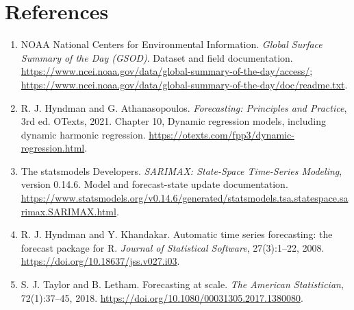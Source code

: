 \documentclass{article}
\begin{document}
\section*{References}
\raggedright
\begin{enumerate}
\item NOAA National Centers for Environmental Information. \emph{Global Surface
Summary of the Day (GSOD)}. Dataset and field documentation.
\url{https://www.ncei.noaa.gov/data/global-summary-of-the-day/access/};
\url{https://www.ncei.noaa.gov/data/global-summary-of-the-day/doc/readme.txt}.
\item R. J. Hyndman and G. Athanasopoulos. \emph{Forecasting: Principles and
Practice}, 3rd ed. OTexts, 2021. Chapter 10, Dynamic regression models,
including dynamic harmonic regression.
\url{https://otexts.com/fpp3/dynamic-regression.html}.
\item The statsmodels Developers. \emph{SARIMAX: State-Space Time-Series
Modeling}, version 0.14.6. Model and forecast-state update documentation.
\url{https://www.statsmodels.org/v0.14.6/generated/statsmodels.tsa.statespace.sarimax.SARIMAX.html}.
\item R. J. Hyndman and Y. Khandakar. Automatic time series forecasting:
the forecast package for R. \emph{Journal of Statistical Software}, 27(3):1--22,
2008. \url{https://doi.org/10.18637/jss.v027.i03}.
\item S. J. Taylor and B. Letham. Forecasting at scale.
\emph{The American Statistician}, 72(1):37--45, 2018.
\url{https://doi.org/10.1080/00031305.2017.1380080}.
\end{enumerate}
\end{document}
